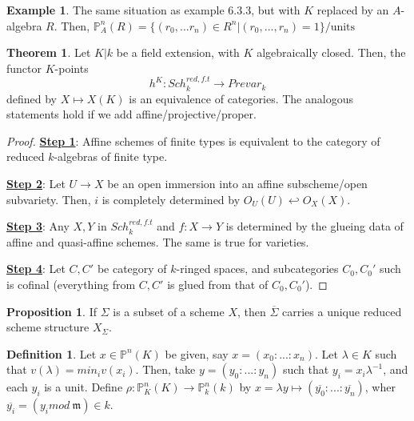 \documentclass{article}
\theoremstyle{definition}
\newtheorem{theorem}{Theorem}[section]
\theoremstyle{definition}
\newtheorem{definition}{Definition}[theorem]
\theoremstyle{definition}
\theoremstyle{definition}
\newtheorem{proposition}{Proposition}[theorem]
\theoremstyle{definition}
\theoremstyle{definition}
\theoremstyle{definition}
\newtheorem{example}{Example}[theorem]
\begin{document}
\begin{tcolorbox}[colback=yellow!5!white,colframe=yellow!30!white]
\begin{example}
The same situation as example $6.3.3$, but with $K$ replaced by an $A$-algebra $R$. Then, $\mathbb{P}^n_A(R)=\{(r_0,...r_n)\in R^n| (r_0,...,r_n)=1\}/ \textrm{units}$
\end{example}
\end{tcolorbox}


\begin{tcolorbox}[colback=red!5!white,colframe=red!30!white]
\begin{theorem}
Let $K|k$ be a field extension, with $K$ algebraically closed. Then, the functor $K$-points 
\[h^K: Sch_k^{red,f.t}\to Prevar_k\] 
defined by $X\mapsto X(K)$ is an equivalence of categories. The analogous statements hold if we add affine/projective/proper. 
\end{theorem}
\end{tcolorbox}
\begin{proof}
    \underline{\textbf{Step 1}}: Affine schemes of finite types is equivalent to the category of reduced $k$-algebras of finite type. 


    \underline{\textbf{Step 2}}: Let $U\to X$ be an open immersion into an affine subscheme/open subvariety. Then, $i$ is completely determined by $O_U(U)\hookleftarrow O_X(X)$.

    \underline{\textbf{Step 3}}: Any $X,Y$ in $Sch_k^{red,f.t}$ and $f: X\to Y$ is determined by the glueing data of affine and quasi-affine schemes. The same is true for varieties. 

    \underline{\textbf{Step 4}}: Let $C,C'$ be category of $k$-ringed spaces, and subcategories $C_0, C_0'$ such is cofinal (everything from $C,C'$ is glued from that of $C_0,C_0'$). 


\end{proof}



\begin{tcolorbox}[colback=blue!5!white,colframe=blue!30!white]
\begin{proposition}
If $\Sigma$ is a subset of a scheme $X$, then $\overline{\Sigma}$ carries a unique reduced scheme structure $X_{\Sigma}$. 
\end{proposition}
\end{tcolorbox}


\begin{tcolorbox}[colback=purple!5!white,colframe=purple!75!black]
\begin{definition}
Let $x\in \mathbb{P}^n(K)$ be given, say $x=(x_0:...:x_n)$. Let $\lambda\in K$ such that $v(\lambda)=min_iv(x_i)$. Then, take $y=(y_0:...:y_n)$ such that $y_i=x_i\lambda^{-1}$, and each $y_i$ is a unit. Define $\rho: \mathbb{P}^n_K(K)\to \mathbb{P}^n_k(k)$ by $x=\lambda y\mapsto (\overline{y_0}:...:\overline{y_n})$, wher $\overline{y_i}=(y_i mod \ \mathfrak{m})\in k$.
\end{definition}
\end{tcolorbox}
\end{document}
